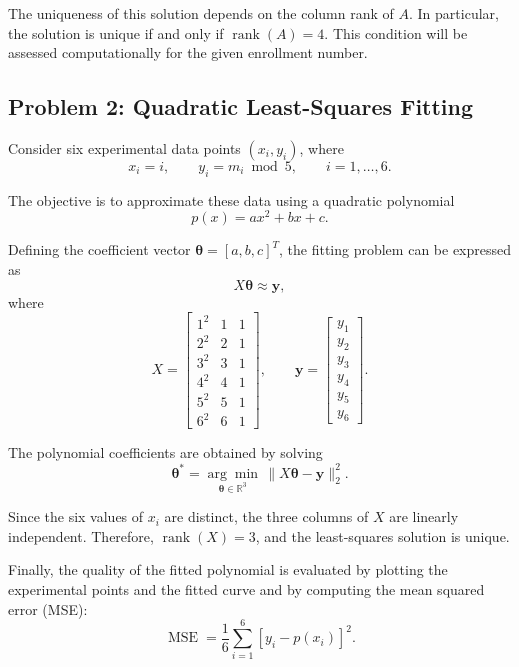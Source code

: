 The uniqueness of this solution depends on the column rank of $A$.
In particular, the solution is unique if and only if
$\operatorname{rank}(A)=4$. This condition will be assessed
computationally for the given enrollment number.

\subsection{Problem 2: Quadratic Least-Squares Fitting}

Consider six experimental data points $(x_i,y_i)$, where
\begin{equation}
    x_i=i,\qquad
    y_i=m_i\bmod 5,\qquad i=1,\ldots,6.
    \label{eq:experimental-data}
\end{equation}

The objective is to approximate these data using a quadratic
polynomial
\begin{equation}
    p(x)=ax^2+bx+c.
\end{equation}

Defining the coefficient vector
$\boldsymbol{\theta}=[a,b,c]^T$, the fitting problem can be
expressed as
\begin{equation}
    X\boldsymbol{\theta}\approx\mathbf{y},
\end{equation}
where
\begin{equation}
    X=
    \begin{bmatrix}
        1^2 & 1 & 1 \\
        2^2 & 2 & 1 \\
        3^2 & 3 & 1 \\
        4^2 & 4 & 1 \\
        5^2 & 5 & 1 \\
        6^2 & 6 & 1
    \end{bmatrix},
    \qquad
    \mathbf{y}=
    \begin{bmatrix}
        y_1 \\y_2\\y_3\\y_4\\y_5\\y_6
    \end{bmatrix}.
    \label{eq:quadratic-system}
\end{equation}

The polynomial coefficients are obtained by solving
\begin{equation}
    \boldsymbol{\theta}^{*}
    =\underset{\boldsymbol{\theta}\in\mathbb{R}^{3}}
    {\arg\min}
    \,\|X\boldsymbol{\theta}-\mathbf{y}\|_2^2.
    \label{eq:ls-quadratic}
\end{equation}

Since the six values of $x_i$ are distinct, the three columns of
$X$ are linearly independent. Therefore,
$\operatorname{rank}(X)=3$, and the least-squares solution is
unique.

Finally, the quality of the fitted polynomial is evaluated by
plotting the experimental points and the fitted curve and by
computing the mean squared error (MSE):
\begin{equation}
    \operatorname{MSE}
    =\frac{1}{6}\sum_{i=1}^{6}
    \left[y_i-p(x_i)\right]^2.
    \label{eq:mse}
\end{equation}